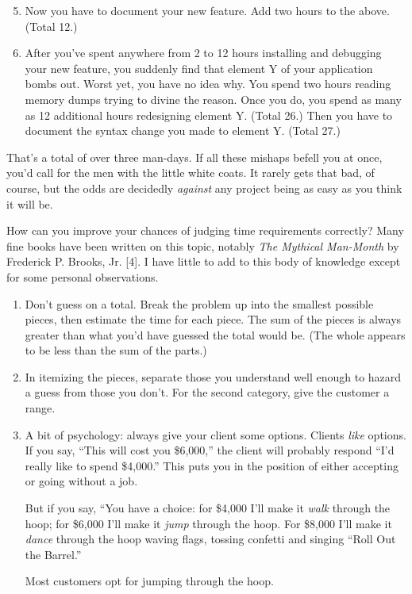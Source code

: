 \begin{enumerate}
    \setcounter{enumi}{4}
\item Now you have to document your new feature. Add two hours to the
above. (Total 12.)
\item After you've spent anywhere from 2 to 12 hours installing and
debugging your new feature, you suddenly find that element Y of your
application bombs out. Worst yet, you have no idea why. You spend two
hours reading memory dumps trying to divine the reason. Once you do,
you spend as many as 12 additional hours redesigning element Y. (Total
26.) Then you have to document the syntax change you made to element
Y. (Total 27.)
\end{enumerate}

\noindent That's a total of over three man-days. If all these mishaps
befell you at once, you'd call for the men with the little white
coats. It rarely gets that bad, of course, but the odds are decidedly
\emph{against} any project being as easy as you think it will be.

How can you improve your chances of judging time requirements
correctly? Many fine books have been written on this topic, notably
\emph{The Mythical Man-Month} by Frederick P. Brooks, Jr. {[}4{]}.
I have little to add to this body of knowledge except for some
personal observations.

\begin{enumerate}

\item Don't guess on a total. Break the problem up into the smallest possible
pieces, then estimate the time for each piece. The sum of the pieces is
always greater than what you'd have guessed the total would be. (The
whole appears to be less than the sum of the parts.)

\item In itemizing the pieces, separate those you understand well enough to
hazard a guess from those you don't. For the second category, give the
customer a range.

\item A bit of psychology: always give your client some options.
Clients \emph{like} options. If you say, ``This will cost you \$6,000,''
the client will probably respond ``I'd really like to spend \$4,000.''
This puts you in the position of either accepting or going without a job.

But if you say, ``You have a choice: for \$4,000 I'll make it
\emph{walk} through the hoop; for \$6,000 I'll make it \emph{jump}
through the hoop. For \$8,000 I'll make it \emph{dance} through the
hoop waving flags, tossing confetti and singing ``Roll Out the Barrel.''

Most customers opt for jumping through the hoop.
\end{enumerate}

